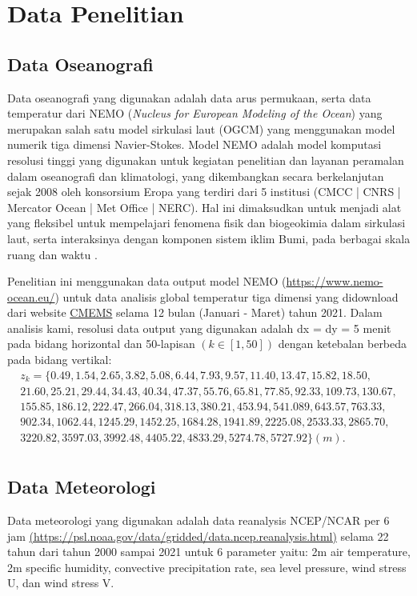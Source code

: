 \section[Data Penelitian]{Data Penelitian}
\begin{spacing}{1.5}
\vspace{-1pc}
\subsection[Data Oseanografi]{Data Oseanografi}
	Data oseanografi yang digunakan adalah data arus permukaan, serta data temperatur dari NEMO (\textit{Nucleus for European Modeling of the Ocean}) yang merupakan salah satu model sirkulasi laut (OGCM) yang menggunakan model numerik tiga dimensi Navier-Stokes. Model NEMO adalah model komputasi resolusi tinggi yang digunakan untuk kegiatan penelitian dan layanan peramalan dalam oseanografi dan klimatologi, yang dikembangkan secara berkelanjutan sejak 2008 oleh konsorsium Eropa yang terdiri dari 5 institusi (CMCC | CNRS | Mercator Ocean | Met Office | NERC). Hal ini dimaksudkan untuk menjadi alat yang fleksibel untuk mempelajari fenomena fisik dan biogeokimia dalam sirkulasi laut, serta interaksinya dengan komponen sistem iklim Bumi, pada berbagai skala ruang dan waktu . 
	
	Penelitian ini menggunakan data output model NEMO (\href{https://www.nemo-ocean.eu/}{https://www.nemo-ocean.eu/}) untuk data analisis global temperatur tiga dimensi yang didownload dari website \href{https://resources.marine.copernicus.eu/products}{CMEMS} selama 12 bulan (Januari - Maret) tahun 2021.  Dalam analisis kami, resolusi data output yang digunakan adalah dx = dy = 5 menit pada bidang horizontal dan 50-lapisan $(k \in [1,50])$ dengan ketebalan berbeda pada bidang vertikal:
	\begin{equation*}
		\begin{aligned}
			z_k = \{0.49, 1.54, 2.65, 3.82, 5.08, 6.44, 7.93, 9.57, 11.40, 13.47, 15.82, 18.50, \\
			21.60, 25.21, 29.44, 34.43, 40.34, 47.37, 55.76, 65.81, 77.85, 92.33, 109.73, 130.67, \\
			155.85, 186.12, 222.47, 266.04, 318.13, 380.21, 453.94, 541.089, 643.57, 763.33, \\
			902.34, 1062.44, 1245.29, 1452.25, 1684.28, 1941.89, 2225.08, 2533.33, 2865.70,  \\
			3220.82, 3597.03, 3992.48, 4405.22, 4833.29, 5274.78, 5727.92 \} (m). \\
		\end{aligned}
	\end{equation*}
\subsection[Data Meteorologi]{Data Meteorologi}
	Data meteorologi yang digunakan adalah data reanalysis NCEP/NCAR per 6 jam \href{https://psl.noaa.gov/data/gridded/data.ncep.reanalysis.html}{(https://psl.noaa.gov/data/gridded/data.ncep.reanalysis.html)} selama 22 tahun dari tahun 2000 sampai 2021 untuk 6 parameter yaitu: 2m air temperature, 2m specific humidity, convective precipitation rate, sea level pressure, wind stress U, dan wind stress V.
\end{spacing}
